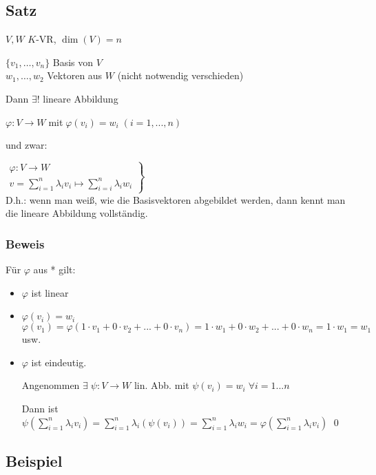 \subsection{Satz}

$V,W$ $K$-VR, $\dim(V)=n$

$\{v_1, \dots, v_n\}$ Basis von $V$ \\
$w_1,\dots, w_2 $ Vektoren aus $W$ (nicht notwendig verschieden)

Dann $\exists!$ lineare Abbildung



$\varphi: V \rightarrow W \;$mit$\; \varphi(v_i) = w_i \; (i=1,...,n)$

und zwar: 

$\left.
\begin{array}{l}
\varphi: V \rightarrow W\\
v=\sum_{i=1}^{n} \lambda_i v_i \mapsto \sum_{i=i}^{n} \lambda_i w_i
\end{array}
\right\rbrace$\huge*\normalsize\\

D.h.: wenn man weiß, wie die Basisvektoren abgebildet werden, dann kennt man die lineare Abbildung vollständig.

\subsubsection*{Beweis}
Für $\varphi$ aus * gilt:
\begin{itemize}
	\item $\varphi$ ist linear
	\item $\varphi(v_i) = w_i$\\
	$\varphi(v_1)=\varphi(1\cdot v_1 + 0 \cdot v_2 + ... + 0 \cdot v_n) = 1 \cdot w_1 + 0 \cdot w_2 + ... + 0 \cdot w_n = 1 \cdot w_1 = w_1$ usw.
	\item $\varphi$ ist eindeutig.
	
	Angenommen $\exists \;\psi: V \rightarrow W$ lin. Abb. mit $\psi(v_i) = w_i \; \forall i=1...n$
	
	Dann ist $\psi(\sum_{i=1}^{n} \lambda_i v_i) = \sum_{i=1}^{n} \lambda_i(\psi(v_i)) = \sum_{i=1}^{n} \lambda_i w_i = \varphi(\sum_{i=1}^{n} \lambda_i v_i) $
	\qed
\end{itemize}

\subsection{Beispiel}
\label{beispiel:drehung}

